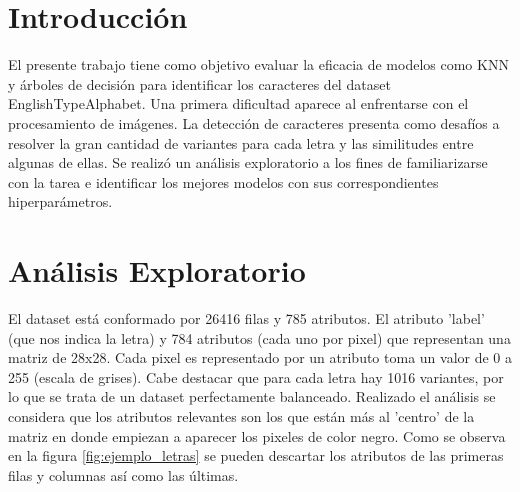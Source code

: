 \documentclass[12pt,a4paper]{article}
\begin{document}



\maketitle
\section*{Introducción}
El presente trabajo tiene como objetivo evaluar la eficacia de modelos como KNN y árboles de decisión para identificar los caracteres del
dataset EnglishTypeAlphabet.
\newline
\newline
Una primera dificultad aparece al enfrentarse con el procesamiento de imágenes.
\newline
La detección de caracteres presenta como desafíos a resolver la gran cantidad de variantes para cada letra y las similitudes entre algunas de ellas.
\newline
\newline
Se realizó un análisis exploratorio a los fines de familiarizarse con la tarea e identificar los mejores modelos con sus correspondientes
hiperparámetros.
\newpage
\section*{Análisis Exploratorio}
El dataset está conformado por 26416 filas y 785 atributos. El atributo 'label' (que nos indica la letra) y 784 atributos (cada uno por pixel)
que representan una matriz de 28x28. Cada pixel es representado por un atributo toma un valor de 0 a 255 (escala de grises).
\newline
\newline
Cabe destacar que para cada letra hay 1016 variantes, por lo que se trata de un dataset perfectamente balanceado.
\newline
Realizado el análisis se considera que los atributos relevantes son los que están más al 'centro' de la
matriz en donde empiezan a aparecer los pixeles de color negro. Como se observa en la figura \ref{fig:ejemplo_letras}
se pueden descartar los atributos de las primeras filas y columnas así como las últimas.
\end{document}
